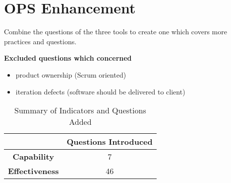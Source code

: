 \section{OPS Enhancement}

Combine the questions of the three tools to create one which covers more practices and questions.

\textbf{Excluded questions which concerned}

\begin{itemize}
	\item product ownership (Scrum oriented)
	\item iteration defects (software should be delivered to client)
\end{itemize}

\begin{table} [H]
\centering
	\begin{tabular}{| c | c |} \hline
		  & \textbf{Questions Introduced} \\ \hline
		 \textbf{Capability} & 7 \\ \hline
		 \textbf{Effectiveness} & 46 \\ \hline
	\end{tabular}
	\caption{Summary of Indicators and Questions Added}
\end{table}

\clearpage